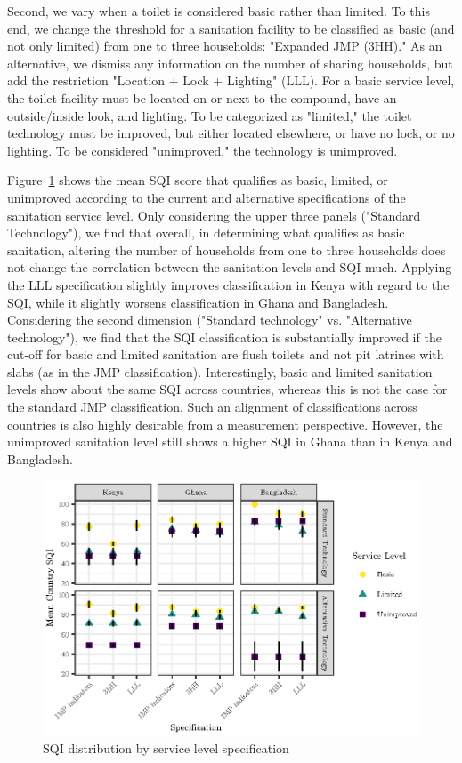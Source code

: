 \documentclass[natbib]{svjour3}                     %
\begin{document}
Second, we vary when a toilet is considered basic rather than limited. To this end, we change the threshold for a sanitation facility to be classified as basic (and not only limited) from one to three households: "Expanded JMP (3HH)." As an alternative, we dismiss any information on the number of sharing households, but add the restriction "Location + Lock + Lighting" (LLL). For a basic service level, the toilet facility must be located on or next to the compound, have an outside/inside look, and lighting. To be categorized as "limited," the toilet technology must be improved, but either located elsewhere, or have no lock, or no lighting. To be considered "unimproved," the technology is unimproved.



Figure~\ref{fig:newlevels} shows the mean SQI score that qualifies as basic, limited, or unimproved according to the current and alternative specifications of the sanitation service level. Only considering the upper three panels ("Standard Technology"), we find that overall, in determining what qualifies as basic sanitation, altering the number of households from one to three households does not change the correlation between the sanitation levels and SQI much. Applying the LLL specification slightly improves classification in Kenya with regard to the SQI, while it slightly worsens classification in Ghana and Bangladesh. Considering the second dimension ("Standard technology" vs. "Alternative technology"), we find that the SQI classification is substantially improved if the cut-off for basic and limited sanitation are flush toilets and not pit latrines with slabs (as in the JMP classification). Interestingly, basic and limited sanitation levels show about the same SQI across countries, whereas this is not the case for the standard JMP classification. Such an alignment of classifications across countries is also highly desirable from a measurement perspective. However, the unimproved sanitation level still shows a higher SQI in Ghana than in Kenya and Bangladesh.

\begin{figure}[htb]
    \centering
    \includegraphics[width=0.99\linewidth]{figures/newlevels.eps}
    \caption{SQI distribution by service level specification}
    \label{fig:newlevels}
\end{figure}
\end{document}
